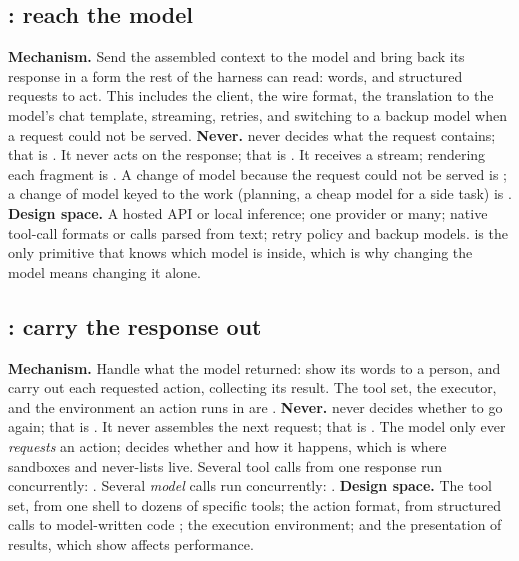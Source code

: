 \subsection{: reach the model}
\textbf{Mechanism.} Send the assembled context to the model and bring back its response in a form the rest of the harness can read: words, and structured requests to act. This includes the client, the wire format, the translation to the model's chat template, streaming, retries, and switching to a backup model when a request could not be served.
\textbf{Never.}  never decides what the request contains; that is . It never acts on the response; that is . It receives a stream; rendering each fragment is . A change of model because the request could not be served is ; a change of model keyed to the work (planning, a cheap model for a side task) is .
\textbf{Design space.} A hosted API or local inference; one provider or many; native tool-call formats or calls parsed from text; retry policy and backup models.  is the only primitive that knows which model is inside, which is why changing the model means changing it alone.

\subsection{: carry the response out}
\textbf{Mechanism.} Handle what the model returned: show its words to a person, and carry out each requested action, collecting its result. The tool set, the executor, and the environment an action runs in are .
\textbf{Never.}  never decides whether to go again; that is . It never assembles the next request; that is . The model only ever \emph{requests} an action;  decides whether and how it happens, which is where sandboxes and never-lists live. Several tool calls from one response run concurrently: . Several \emph{model} calls run concurrently: .
\textbf{Design space.} The tool set, from one shell to dozens of specific tools; the action format, from structured calls to model-written code \cite{wang2024codeact}; the execution environment; and the presentation of results, which \cite{yang2024sweagent} show affects performance.

